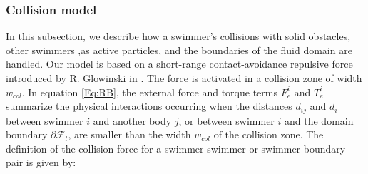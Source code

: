 \documentclass[graybox]{svmult}
\newcommand{\Fluid}{\mathcal{F}} %
\newcommand{\Alemap}{\mathcal{A}} %
\newcommand{\ALE}{ALE} %
\newcommand{\Vel}{u} %
\newcommand{\tvel}{U} %
\newcommand{\angvel}{\omega} %
\newcommand{\CenterMass}{x^{CM}} %
\newcommand{\Solid}{\mathcal{S}} %
\begin{document}




\subsubsection{Collision model} 
\label{rigidcollision}

In this subsection, we describe how a swimmer's collisions with solid obstacles, other swimmers ,as active particles, and the boundaries of the fluid domain are handled. Our model is based on a short-range contact-avoidance repulsive force introduced by R. Glowinski in \cite{glowinski_fictitious_1998}. The force is activated in a collision zone of width $w_{col}$.
In equation \eqref{Eq:RB}, the external force and torque terms $F_e^i$ and $T_e^i$ summarize the physical interactions occurring when the distances $d_{ij}$ and $d_{i}$ between swimmer $i$ and another body $j$, or between swimmer $i$ and the domain boundary $\partial \Fluid_t$, are smaller than the width $w_{col}$ of the collision zone.  
The definition of the collision force for a swimmer-swimmer or swimmer-boundary pair is given by: 
\end{document}
